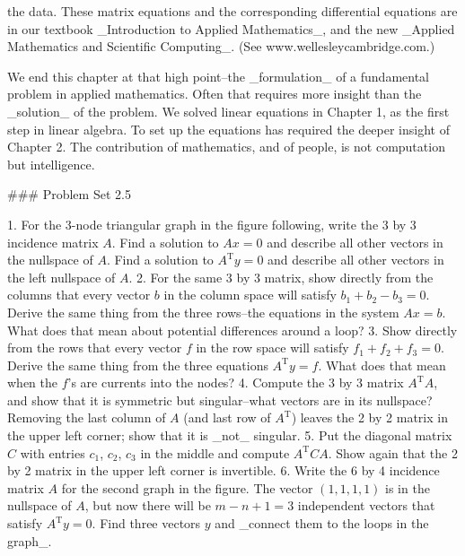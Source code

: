 the data. These matrix equations and the corresponding differential equations are in our textbook _Introduction to Applied Mathematics_, and the new _Applied Mathematics and Scientific Computing_. (See www.wellesleycambridge.com.)

We end this chapter at that high point--the _formulation_ of a fundamental problem in applied mathematics. Often that requires more insight than the _solution_ of the problem. We solved linear equations in Chapter 1, as the first step in linear algebra. To set up the equations has required the deeper insight of Chapter 2. The contribution of mathematics, and of people, is not computation but intelligence.

### Problem Set 2.5

1. For the 3-node triangular graph in the figure following, write the 3 by 3 incidence matrix \(A\). Find a solution to \(Ax=0\) and describe all other vectors in the nullspace of \(A\). Find a solution to \(A^{\mathrm{T}}y=0\) and describe all other vectors in the left nullspace of \(A\).
2. For the same 3 by 3 matrix, show directly from the columns that every vector \(b\) in the column space will satisfy \(b_{1}+b_{2}-b_{3}=0\). Derive the same thing from the three rows--the equations in the system \(Ax=b\). What does that mean about potential differences around a loop?
3. Show directly from the rows that every vector \(f\) in the row space will satisfy \(f_{1}+f_{2}+f_{3}=0\). Derive the same thing from the three equations \(A^{\mathrm{T}}y=f\). What does that mean when the \(f\)'s are currents into the nodes?
4. Compute the 3 by 3 matrix \(A^{\mathrm{T}}A\), and show that it is symmetric but singular--what vectors are in its nullspace? Removing the last column of \(A\) (and last row of \(A^{\mathrm{T}}\)) leaves the 2 by 2 matrix in the upper left corner; show that it is _not_ singular.
5. Put the diagonal matrix \(C\) with entries \(c_{1}\), \(c_{2}\), \(c_{3}\) in the middle and compute \(A^{\mathrm{T}}CA\). Show again that the 2 by 2 matrix in the upper left corner is invertible.
6. Write the 6 by 4 incidence matrix \(A\) for the second graph in the figure. The vector \((1,1,1,1)\) is in the nullspace of \(A\), but now there will be \(m-n+1=3\) independent vectors that satisfy \(A^{\mathrm{T}}y=0\). Find three vectors \(y\) and _connect them to the loops in the graph_.

 